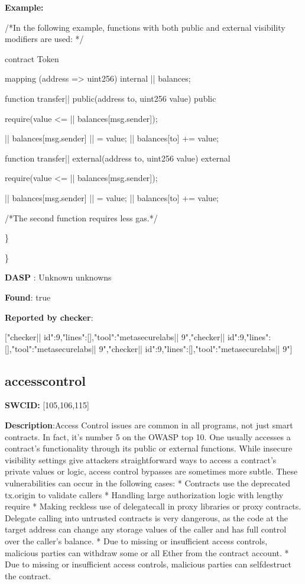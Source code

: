 \documentclass{article}
\begin{document}
\textbf{Example:} 
\begin{ffcode} 

 /*In the following example, functions with both public and external visibility modifiers are used: */ 

contract Token {

    mapping (address => uint256) internal |\textunderscore| balances;

    function transfer|\textunderscore| public(address to, uint256 value) public {
        require(value <= |\textunderscore| balances[msg.sender]);

        |\textunderscore| balances[msg.sender] |\textendash| = value;
        |\textunderscore| balances[to] += value;
    }

    function transfer|\textunderscore| external(address to, uint256 value) external {
        require(value <= |\textunderscore| balances[msg.sender]);

        |\textunderscore| balances[msg.sender] |\textendash| = value;
        |\textunderscore| balances[to] += value;
    }
}

 /*The second function requires less gas.*/ 

\end{ffcode} 
\} 

\} 

\textbf{DASP} : Unknown unknowns

\textbf{Found}: true

\textbf{Reported by checker}: 
\begin{ffcode} 

[{"checker|\textunderscore| id":9,"lines":[],"tool":"metasecurelabs|\textendash| 9"},{"checker|\textunderscore| id":9,"lines":[],"tool":"metasecurelabs|\textendash| 9"},{"checker|\textunderscore| id":9,"lines":[],"tool":"metasecurelabs|\textendash| 9"}]
\end{ffcode} 
\subsection{access{\textunderscore}control} 
\textbf{SWC{\textunderscore}ID:} [105,106,115]

\textbf{Description}:Access Control issues are common in all programs, not just smart contracts. In fact, it's number 5 on the OWASP top 10. One usually accesses a contract's functionality through its public or external functions. While insecure visibility settings give attackers straightforward ways to access a contract's private values or logic, access control bypasses are sometimes more subtle. These vulnerabilities can occur in the following cases:
* Contracts use the deprecated tx.origin to validate callers
* Handling large authorization logic with lengthy require
* Making reckless use of delegatecall in proxy libraries or proxy contracts. Delegate calling into untrusted contracts is very dangerous, as the code at the target address can change any storage values of the caller and has full control over the caller's balance.
* Due to missing or insufficient access controls, malicious parties can withdraw some or all Ether from the contract account.
* Due to missing or insufficient access controls, malicious parties can self{\textendash}destruct the contract.
\end{document}
